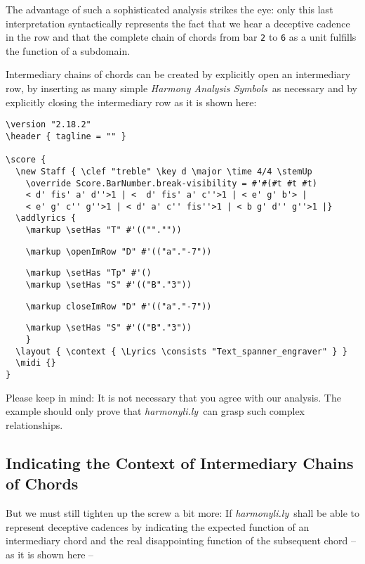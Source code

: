 \documentclass[
  DIV=calc,
  BCOR=5mm,
  12pt,
  headings=small,
  oneside,
  abstract=true,
  toc=bib,
  xcolor=dvipsnames,
  openany,
  ngerman,english]{scrartcl}
\newcommand{\hlyn}[0]{\textit{harmonyli.ly}}
\newcommand{\has}[1]{\textit{Harmony Analysis Symbol#1}}
\begin{document}
The advantage of such a sophisticated analysis strikes the eye: only this last
interpretation syntactically represents the fact that we hear a deceptive
cadence in the row and that the complete chain of chords from bar \texttt{2} to
\texttt{6} as a unit fulfills the function of a subdomain.

Intermediary chains of chords can be created by explicitly open an intermediary
row, by inserting as many simple \has{s}\ as necessary and by explicitly closing
the intermediary row as it is shown here:
\begin{scriptsize}
\begin{verbatim}
\version "2.18.2"
\header { tagline = "" }

\score {
  \new Staff { \clef "treble" \key d \major \time 4/4 \stemUp 
    \override Score.BarNumber.break-visibility = #'#(#t #t #t)
    < d' fis' a' d''>1 | <  d' fis' a' c''>1 | < e' g' b'> |
    < e' g' c'' g''>1 | < d' a' c'' fis''>1 | < b g' d'' g''>1 |}
  \addlyrics { 
    \markup \setHas "T" #'((""."")) 
\end{verbatim}
{ \color{red} \verb|    \markup \openImRow "D" #'(("a"."-7"))| }
\begin{verbatim} 
    \markup \setHas "Tp" #'() 
    \markup \setHas "S" #'(("B"."3"))     
\end{verbatim}
{ \color{red} \verb|    \markup closeImRow "D" #'(("a"."-7"))| }
\begin{verbatim}  
    \markup \setHas "S" #'(("B"."3"))
    }
  \layout { \context { \Lyrics \consists "Text_spanner_engraver" } }
  \midi {}
}

\end{verbatim}
\end{scriptsize}


Please keep in mind: It is not necessary that you agree with our analysis. The
example should only prove that \hlyn\ can grasp such complex relationships.

\subsection{Indicating the Context of Intermediary Chains of Chords}

But we must still tighten up the screw a bit more: If \hlyn\ shall be able to
represent deceptive cadences by indicating the expected function of an
intermediary chord and the real disappointing function of the subsequent chord
-- as it is shown here --

\begin{center}
\end{center}
\end{document}
